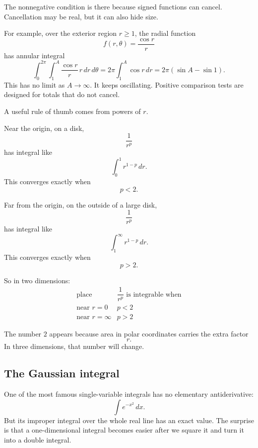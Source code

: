 The nonnegative condition is there because signed functions can cancel.  Cancellation
may be real, but it can also hide size.

For example, over the exterior region \(r\ge1\), the radial function
\[
    f(r,\theta)=\frac{\cos r}{r}
\]
has annular integral
\[
    \int_0^{2\pi}\int_1^A \frac{\cos r}{r}\,r\,dr\,d\theta
    =
    2\pi\int_1^A \cos r\,dr
    =
    2\pi(\sin A-\sin 1).
\]
This has no limit as \(A\to\infty\).  It keeps oscillating.  Positive comparison tests
are designed for totals that do not cancel.

A useful rule of thumb comes from powers of \(r\).

Near the origin, on a disk,
\[
    \frac1{r^p}
\]
has integral like
\[
    \int_0^1 r^{1-p}\,dr.
\]
This converges exactly when
\[
    p<2.
\]

Far from the origin, on the outside of a large disk,
\[
    \frac1{r^p}
\]
has integral like
\[
    \int_1^\infty r^{1-p}\,dr.
\]
This converges exactly when
\[
    p>2.
\]

So in two dimensions:
\[
\begin{array}{c|c}
\text{place} & \dfrac1{r^p}\text{ is integrable when} \\ \hline
\text{near }r=0 & p<2\\[2mm]
\text{near }r=\infty & p>2
\end{array}
\]

The number \(2\) appears because area in polar coordinates carries the extra factor
\[
    r.
\]
In three dimensions, that number will change.

\subsection{The Gaussian integral}

One of the most famous single-variable integrals has no elementary antiderivative:
\[
    \int e^{-x^2}\,dx.
\]
But its improper integral over the whole real line has an exact value.  The surprise is
that a one-dimensional integral becomes easier after we square it and turn it into a
double integral.

